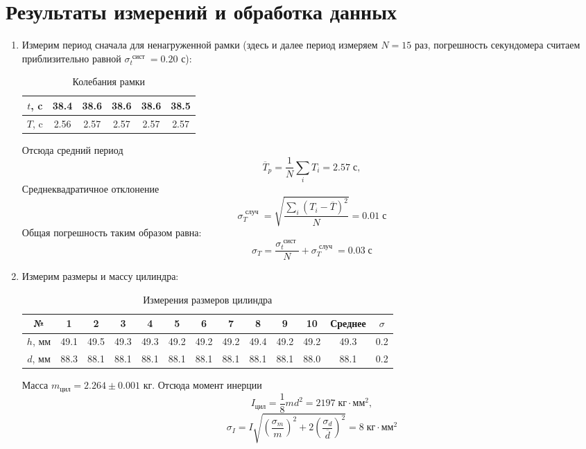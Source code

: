 \documentclass[a4paper, 12pt]{article}
\begin{document}
	\section{Результаты измерений и обработка данных}
	\begin{enumerate}
		\item Измерим период сначала для ненагруженной рамки (здесь и далее
		период измеряем $N = 15$ раз, погрешность секундомера считаем приблизительно
		равной $\sigma_t^{\text{ сист }} = 0.20$ с):
		\begin{table}[H]
			\centering
			\caption{Колебания рамки}
			\begin{tabular}{|c|c|c|c|c|c|}
			\hline
			$t$, c & 38.4 & 38.6 & 38.6 & 38.6 & 38.5 \\ \hline
			$T$, c & 2.56 & 2.57 & 2.57 & 2.57 & 2.57 \\ \hline
			\end{tabular}
		\end{table}

		Отсюда средний период
		$$ \overline {T}_{p} = \frac{1}{N}\sum_{i} T_i = 2.57\; \text{с}, $$
		Среднеквадратичное отклонение
		$$ \sigma_T^{\text{ случ }} = \sqrt{\frac{ \sum_{i} (T_i - \overline {T})^2}{N} } = 0.01\; \text{с} $$
		Общая погрешность таким образом равна:
		$$ \sigma_T = \frac{\sigma_t^{\text{ сист }}}{N} + \sigma_T^{\text{ случ }} = 0.03\; \text{с}$$

		\item Измерим размеры и массу цилиндра:
		\begin{table}[H]
			\centering
			\caption{Измерения размеров цилиндра}
			\begin{tabular}{|c|c|c|c|c|c|c|c|c|c|c|c|c|}
			\hline
			№       & 1    & 2    & 3    & 4    & 5    & 6    & 7    & 8    & 9    & 10   & Среднее & $\sigma$ \\ \hline
			$h$, мм & 49.1 & 49.5 & 49.3 & 49.3 & 49.2 & 49.2 & 49.2 & 49.4 & 49.2 & 49.2 & 49.3    & 0.2                    \\ \hline
			$d$, мм & 88.3 & 88.1 & 88.1 & 88.1 & 88.1 & 88.1 & 88.1 & 88.1 & 88.1 & 88.0 & 88.1    & 0.2                    \\ \hline
			\end{tabular}
		\end{table}

		Масса $m_{\text{цил}} = 2.264\pm0.001$ кг.
		Отсюда момент инерции
		$$I_{\text{цил}} = \frac{1}{8}md^2 = 2197\; \text{кг} \cdot \text{мм} ^2, $$
		$$ \sigma_I = I\sqrt{\left( \frac{\sigma_m}{m} \right) ^ 2 + 2\left( \frac{\sigma_d}
		{\overline{d}} \right) ^ 2} = 8\; \text{кг} \cdot \text{мм} ^2 $$


\end{enumerate}
\end{document}
